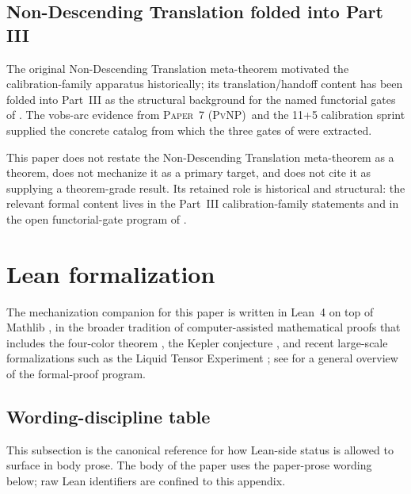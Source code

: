 \documentclass[11pt]{article}
\newcommand{\PaperPvNP}{\textsc{Paper~7 (PvNP)}}
\theoremstyle{definition}
\begin{document}
\subsection{Non-Descending Translation folded into Part III}
\label{sec:scope:m6-theorem-7-folded}

The original Non-Descending Translation meta-theorem motivated the
calibration-family apparatus historically; its translation/handoff
content has been folded into Part~III as the structural background
for the named functorial gates of
.  The vobs-arc evidence from
\PaperPvNP\ and the 11+5 calibration sprint supplied the concrete
catalog from which the three gates of
 were extracted.

This paper does not restate the Non-Descending Translation
meta-theorem as a theorem, does not mechanize it as a primary target,
and does not cite it as supplying a theorem-grade result.  Its
retained role is historical and structural: the relevant formal
content lives in the Part~III calibration-family statements and in
the open functorial-gate program of .
 
\appendix
\section{Lean formalization}\label{app:formalization}



The mechanization companion for this paper is written in Lean~4
\cite{deMouraUllrich2021Lean4} on top of Mathlib
\cite{MathlibCommunity2020Lean}, in the broader tradition of
computer-assisted mathematical proofs that includes the four-color
theorem \cite{Gonthier2008FourColor}, the Kepler conjecture
\cite{HalesEtAl2017Flyspeck}, and recent large-scale formalizations
such as the Liquid Tensor Experiment \cite{CommelinTopaz2024LTE}; see
\cite{HalesNotices2008FormalProof} for a general overview of the
formal-proof program.

\subsection{Wording-discipline table}\label{app:formalization:wording-table}

This subsection is the canonical reference for how Lean-side status is
allowed to surface in body prose.  The body of the paper uses the
paper-prose wording below; raw Lean identifiers are confined to this
appendix.
\end{document}
